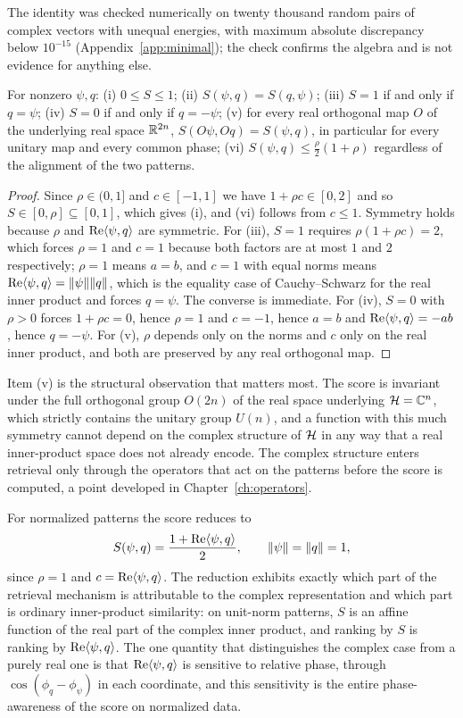 The identity was checked numerically on twenty thousand random pairs of complex vectors with unequal energies, with maximum absolute discrepancy below $10^{-15}$ (Appendix~\ref{app:minimal}); the check confirms the algebra and is not evidence for anything else.

\begin{corollary}\label{cor:bounds}
For nonzero $\psi,q$: (i) $0\le S\le 1$; (ii) $S(\psi,q)=S(q,\psi)$; (iii) $S=1$ if and only if $q=\psi$; (iv) $S=0$ if and only if $q=-\psi$; (v) for every real orthogonal map $O$ of the underlying real space $\mathbb{R}^{2n}$, $S(O\psi,Oq)=S(\psi,q)$, in particular for every unitary map and every common phase; (vi) $S(\psi,q)\le\frac\rho2(1+\rho)$ regardless of the alignment of the two patterns.
\end{corollary}

\begin{proof}
Since $\rho\in(0,1]$ and $c\in[-1,1]$ we have $1+\rho c\in[0,2]$ and so $S\in[0,\rho]\subseteq[0,1]$, which gives (i), and (vi) follows from $c\le1$. Symmetry holds because $\rho$ and $\operatorname{Re}\langle \psi,q\rangle$ are symmetric. For (iii), $S=1$ requires $\rho(1+\rho c)=2$, which forces $\rho=1$ and $c=1$ because both factors are at most $1$ and $2$ respectively; $\rho=1$ means $a=b$, and $c=1$ with equal norms means $\operatorname{Re}\langle \psi,q\rangle=\lVert \psi\rVert\lVert q\rVert$, which is the equality case of Cauchy--Schwarz for the real inner product and forces $q=\psi$. The converse is immediate. For (iv), $S=0$ with $\rho>0$ forces $1+\rho c=0$, hence $\rho=1$ and $c=-1$, hence $a=b$ and $\operatorname{Re}\langle \psi,q\rangle=-ab$, hence $q=-\psi$. For (v), $\rho$ depends only on the norms and $c$ only on the real inner product, and both are preserved by any real orthogonal map.
\end{proof}

Item (v) is the structural observation that matters most. The score is invariant under the full orthogonal group $O(2n)$ of the real space underlying $\mathcal{H}=\mathbb{C}^n$, which strictly contains the unitary group $U(n)$, and a function with this much symmetry cannot depend on the complex structure of $\mathcal{H}$ in any way that a real inner-product space does not already encode. The complex structure enters retrieval only through the operators that act on the patterns before the score is computed, a point developed in Chapter~\ref{ch:operators}.

For normalized patterns the score reduces to
\begin{equation}\label{eq:normalized}
S(\psi,q)=\frac{1+\operatorname{Re}\langle \psi,q\rangle}{2},\qquad \lVert \psi\rVert=\lVert q\rVert=1,
\end{equation}
since $\rho=1$ and $c=\operatorname{Re}\langle \psi,q\rangle$. The reduction exhibits exactly which part of the retrieval mechanism is attributable to the complex representation and which part is ordinary inner-product similarity: on unit-norm patterns, $S$ is an affine function of the real part of the complex inner product, and ranking by $S$ is ranking by $\operatorname{Re}\langle \psi,q\rangle$. The one quantity that distinguishes the complex case from a purely real one is that $\operatorname{Re}\langle \psi,q\rangle$ is sensitive to relative phase, through $\cos(\phi_q-\phi_\psi)$ in each coordinate, and this sensitivity is the entire phase-awareness of the score on normalized data.

